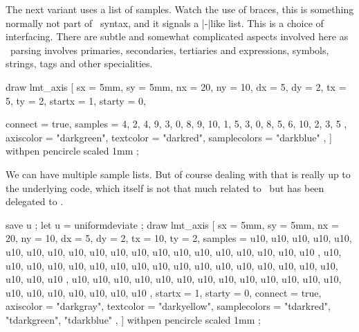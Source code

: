 
The next variant uses a list of samples. Watch the use of braces, this is
something normally not part of \METAPOST\ syntax, and it signals a \LUA|-|like
list. This is a choice of interfacing. There are subtle and somewhat complicated
aspects involved here as \METAPOST\ parsing involves primaries, secondaries,
tertiaries and expressions, symbols, strings, tags and other specialities.


\startbuffer
{}
    draw lmt_axis [
        sx     =  5mm, sy     =  5mm,
        nx     = 20,   ny     = 10,
        dx     =  5,   dy     =  2,
        tx     =  5,   ty     =  2,
        startx =  1,   starty =  0,

        connect = true,
        samples = {
            {
                4, 2, 4, 9, 3, 0, 8, 9, 10, 1,
                5, 3, 0, 8, 5, 6, 10, 2, 3, 5
            }
        },
        axiscolor    = "darkgreen",
        textcolor    = "darkred",
        samplecolors = {
            "darkblue"
        },
    ] withpen pencircle scaled 1mm ;
\stopMPcode
\stopbuffer

\typebuffer[option=TEX]

\startlinecorrection
\getbuffer
\stoplinecorrection

We can have multiple sample lists. But of course dealing with that is really up
to the underlying code, which itself is not that much related to \METAPOST\ but
has been delegated to \LUA.

\startbuffer
\definecolor[tdarkred]  [r=.6,a=1,t=.5]
\definecolor[tdarkgreen][g=.6,a=1,t=.5]
\definecolor[tdarkblue] [b=.6,a=1,t=.5]

    save u ; let u = uniformdeviate ;
    draw lmt_axis [
        sx =  5mm, sy =  5mm,
        nx = 20,   ny = 10,
        dx =  5,   dy =  2,
        tx = 10,   ty =  2,
        samples = {
            {
                u10, u10, u10, u10, u10,
                u10, u10, u10, u10, u10,
                u10, u10, u10, u10, u10,
                u10, u10, u10, u10, u10
            },
            {
                u10, u10, u10, u10, u10,
                u10, u10, u10, u10, u10,
                u10, u10, u10, u10, u10,
                u10, u10, u10, u10, u10
            },
            {
                u10, u10, u10, u10, u10,
                u10, u10, u10, u10, u10,
                u10, u10, u10, u10, u10,
                u10, u10, u10, u10, u10
            }
        },
        startx       = 1,
        starty       = 0,
        connect      = true,
        axiscolor    = "darkgray",
        textcolor    = "darkyellow",
        samplecolors = {
            "tdarkred",
            "tdarkgreen",
            "tdarkblue"
        },
    ] withpen pencircle scaled 1mm ;
\stopMPcode
\stopbuffer

